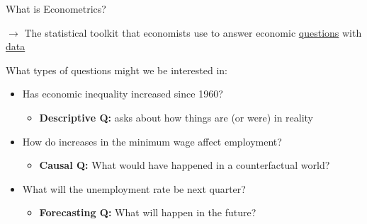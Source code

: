 \documentclass[11pt,english,handout]{beamer}
\begin{document}
\begin{frame}{What is Econometrics?}

\vspace{0.2cm}
$\rightarrow$ The statistical toolkit that economists use to answer economic \uline{questions} with \uline{data}
\bigskip 

What types of questions might we be interested in: 
\pause
\medskip

\begin{itemize}
\item<1-> Has economic inequality increased since 1960?
	\begin{itemize}
		\item<3-> \textbf{Descriptive Q:} asks about how things are (or were) in reality
	\end{itemize}
\item<1-> How do increases in the minimum wage affect employment? 
	\begin{itemize}
		\item<4-> \textbf{Causal Q:} What would have happened in a counterfactual world?  
	\end{itemize}
\item<1->   What will the unemployment rate be next quarter?
	\begin{itemize}
	\item<5-> \textbf{Forecasting Q:} What will happen in the future?  
\end{itemize}

\end{itemize}
\medskip

\pause 
{}

\end{frame}
\end{document}
